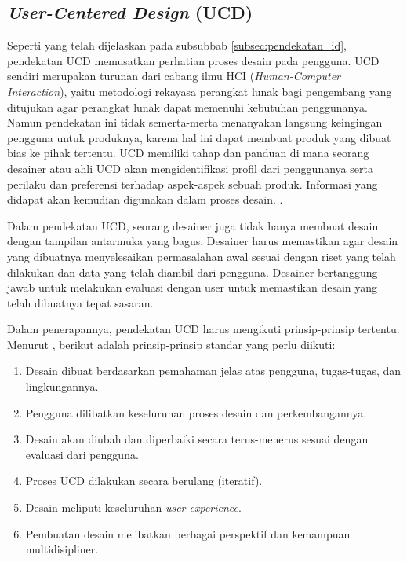\subsection{\textit{User-Centered Design} (UCD)}
Seperti yang telah dijelaskan pada subsubbab \ref{subsec:pendekatan_id}, pendekatan UCD memusatkan perhatian proses desain pada pengguna. UCD sendiri merupakan turunan dari cabang ilmu HCI (\textit{Human-Computer Interaction}), yaitu metodologi rekayasa perangkat lunak bagi pengembang yang ditujukan agar perangkat lunak dapat memenuhi kebutuhan penggunanya. \parencite{lowdermilk2013user} Namun pendekatan ini tidak semerta-merta menanyakan langsung keingingan pengguna untuk produknya, karena hal ini dapat membuat produk yang dibuat bias ke pihak tertentu. UCD memiliki tahap dan panduan di mana seorang desainer atau ahli UCD akan mengidentifikasi profil dari penggunanya serta perilaku dan preferensi terhadap aspek-aspek sebuah produk. Informasi yang didapat akan kemudian digunakan dalam proses desain. \parencite{10.1145/1621995.1621997}.

Dalam pendekatan UCD, seorang desainer juga tidak hanya membuat desain dengan tampilan antarmuka yang bagus. Desainer harus memastikan agar desain yang dibuatnya menyelesaikan permasalahan awal sesuai dengan riset yang telah dilakukan dan data yang telah diambil dari pengguna. Desainer bertanggung jawab untuk melakukan evaluasi dengan user untuk memastikan desain yang telah dibuatnya tepat sasaran. \parencite{lowdermilk2013user}

Dalam penerapannya, pendekatan UCD harus mengikuti prinsip-prinsip tertentu. Menurut \textcite{iso9241-210:2010}, berikut adalah prinsip-prinsip standar yang perlu diikuti:

\begin{enumerate}
  \item Desain dibuat berdasarkan pemahaman jelas atas pengguna, tugas-tugas, dan lingkungannya.
  \item Pengguna dilibatkan keseluruhan proses desain dan perkembangannya.
  \item Desain akan diubah dan diperbaiki secara terus-menerus sesuai dengan evaluasi dari pengguna.
  \item Proses UCD dilakukan secara berulang (iteratif).
  \item Desain meliputi keseluruhan \textit{user experience}.
  \item Pembuatan desain melibatkan berbagai perspektif dan kemampuan multidisipliner.
\end{enumerate}

